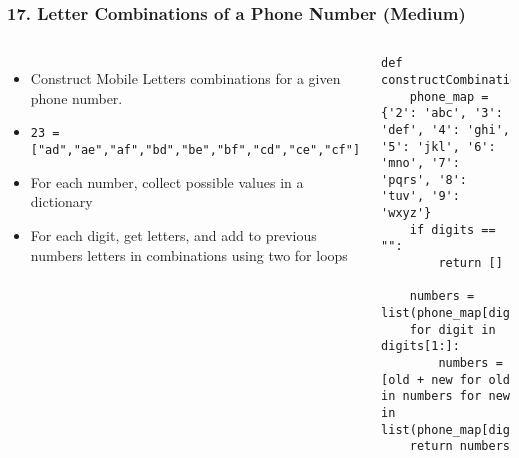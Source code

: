 \begin{frame}[fragile]\frametitle{17. Letter Combinations of a Phone Number (Medium)}

	\begin{columns}[T]
	\begin{itemize}
	\item Construct Mobile Letters combinations for a given phone number.
	\item \lstinline{23 = ["ad","ae","af","bd","be","bf","cd","ce","cf"]}
	\item For each number, collect possible values in a dictionary
	\item For each digit, get letters, and add to previous numbers letters in combinations using two for loops
	\end{itemize}
		\begin{lstlisting}[basicstyle=\scriptsize]
def constructCombinations(digits):
    phone_map = {'2': 'abc', '3': 'def', '4': 'ghi', '5': 'jkl', '6': 'mno', '7': 'pqrs', '8': 'tuv', '9': 'wxyz'}
    if digits == "":
        return []

    numbers = list(phone_map[digits[0]])
    for digit in digits[1:]:
        numbers = [old + new for old in numbers for new in list(phone_map[digit])]
    return numbers
				\end{lstlisting}		

	\end{columns}
		
\end{frame}

